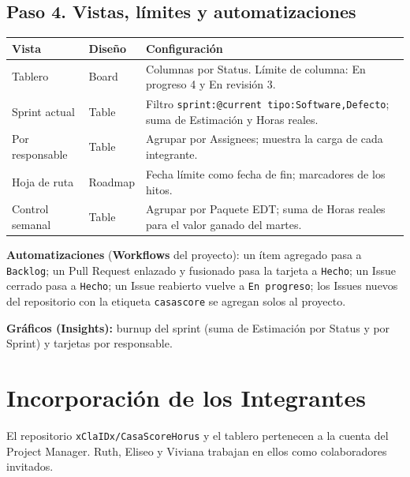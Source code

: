 \documentclass[11pt,a4paper]{article}
\begin{document}
\subsection{Paso 4. Vistas, límites y automatizaciones}
{\small
{}
\noindent\begin{tabularx}{\textwidth}{@{}P{3.0cm} P{2.2cm} L@{}}
\toprule
{}
\textbf{Vista} & \textbf{Diseño} & \textbf{Configuración} \\
\midrule
Tablero & Board & Columnas por Status. Límite de columna: En progreso 4 y En revisión 3. \\
Sprint actual & Table & Filtro \texttt{sprint:@current tipo:Software,Defecto}; suma de Estimación y Horas reales. \\
Por responsable & Table & Agrupar por Assignees; muestra la carga de cada integrante. \\
Hoja de ruta & Roadmap & Fecha límite como fecha de fin; marcadores de los hitos. \\
Control semanal & Table & Agrupar por Paquete EDT; suma de Horas reales para el valor ganado del martes. \\
\bottomrule
\end{tabularx}
}

\vspace{0.1cm}
\noindent\textbf{Automatizaciones} (\textbf{Workflows} del proyecto): un ítem agregado pasa a \texttt{Backlog}; un Pull Request enlazado y fusionado pasa la tarjeta a \texttt{Hecho}; un Issue cerrado pasa a \texttt{Hecho}; un Issue reabierto vuelve a \texttt{En progreso}; los Issues nuevos del repositorio con la etiqueta \texttt{casascore} se agregan solos al proyecto.

\vspace{0.1cm}
\noindent\textbf{Gráficos (Insights):} burnup del sprint (suma de Estimación por Status y por Sprint) y tarjetas por responsable.

\section{Incorporación de los Integrantes}
El repositorio \texttt{xClaIDx/CasaScoreHorus} y el tablero pertenecen a la cuenta del Project Manager. Ruth, Eliseo y Viviana trabajan en ellos como colaboradores invitados.
\end{document}
